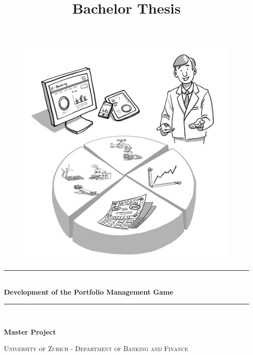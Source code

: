 \documentclass[a4paper,twoside, openright]{scrartcl}
\title{Bachelor Thesis}
\newcommand{\HRule}{\rule{\linewidth}{0.3mm}} %
\begin{document}
\begin{titlepage}
\begingroup
\centering
\vspace*{\baselineskip}

\thispagestyle{empty}

\begin{figure}[H]
	\centering
	\begin{minipage}{.49\textwidth}
		\centering
		\includegraphics[scale=0.4]{img/InvestmentSolutions.jpg}
	\end{minipage}
\end{figure}

\vspace*{1\baselineskip}

\HRule \\[0.4cm]
{\LARGE \textbf{Development of the Portfolio Management Game}}
\HRule \\[1.5cm]

\vspace*{1\baselineskip}

{\large \textbf{Master Project}}

\vspace*{1\baselineskip}

\scshape %
\large University of Zurich - Department of Banking and Finance \\ \vspace{3.5mm}


\end{titlepage}
\end{document}
